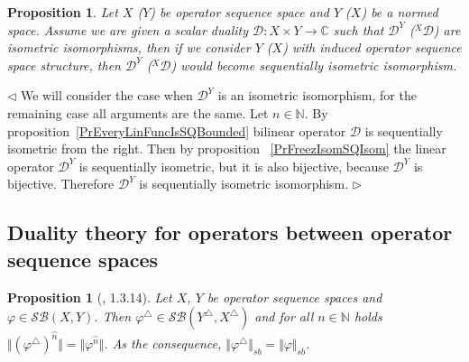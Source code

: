 \documentclass[12pt]{article}
\newtheorem{proposition}[theorem]{Proposition}
\newenvironment{proof}{\par $\triangleleft$}{$\triangleright$}
\begin{document}
\begin{proposition}\label{PrFreezDualityGetSQIsom}
Let $X$ ($Y$) be operator sequence space and $Y$ ($X$) be a normed space. 
Assume we are given a scalar duality $\mathcal{D}:X\times Y\to\mathbb{C}$ such 
that $\mathcal{D}^Y$ (${}^X\mathcal{D}$) 
are isometric isomorphisms, then if we consider $Y$ ($X$) with induced operator 
sequence space structure, then $\mathcal{D}^Y$ (${}^X\mathcal{D}$) would become 
sequentially isometric isomorphism.
\end{proposition}
\begin{proof}
We will consider the case when $\mathcal{D}^Y$ is an isometric isomorphism, for 
the remaining case all arguments are the same. Let $n\in\mathbb{N}$. By 
proposition~\ref{PrEveryLinFuncIsSQBounded} bilinear operator $\mathcal{D}$ is 
sequentially isometric from the right. Then by proposition 
~\ref{PrFreezIsomSQIsom} the linear operator $\mathcal{D}^Y$ is sequentially 
isometric, but it is also bijective, because $\mathcal{D}^Y$ is bijective. 
Therefore $\mathcal{D}^Y$ is sequentially isometric isomorphism. 
\end{proof}































\subsection{Duality theory for operators between operator sequence spaces}

\begin{proposition}[\cite{LamOpFolgen}, 1.3.14]\label{PrDualSBOp}
Let $X$, $Y$ be operator sequence spaces and $\varphi\in \mathcal{SB}(X,Y)$. 
Then $\varphi^\triangle \in\mathcal{SB}(Y^\triangle ,X^\triangle )$ and for all 
$n\in\mathbb{N}$ holds 
$\Vert{(\varphi^\triangle )}^{\wideparen{n}}\Vert
=\Vert\varphi^{\wideparen{n}}\Vert$. As the consequence, 
$\Vert\varphi^\triangle \Vert_{sb}=\Vert\varphi\Vert_{sb}$.
\end{proposition}
\end{document}
